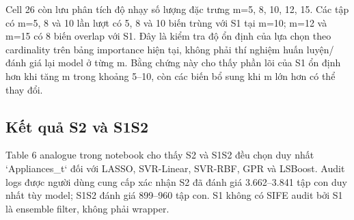 Cell 26 còn lưu phân tích độ nhạy số lượng đặc trưng m=5, 8, 10, 12, 15. Các tập có m=5, 8 và 10 lần lượt có 5, 8 và 10 biến trùng với S1 tại m=10; m=12 và m=15 có 8 biến overlap với S1. Đây là kiểm tra độ ổn định của lựa chọn theo cardinality trên bảng importance hiện tại, không phải thí nghiệm huấn luyện/đánh giá lại model ở từng m. Bằng chứng này cho thấy phần lõi của S1 ổn định hơn khi tăng m trong khoảng 5--10, còn các biến bổ sung khi m lớn hơn có thể thay đổi.

\subsection{Kết quả S2 và S1S2}\label{kux1ebft-quux1ea3-s2-vuxe0-s1s2}

Table 6 analogue trong notebook cho thấy S2 và S1S2 đều chọn duy nhất `Appliances\_t` đối với LASSO, SVR-Linear, SVR-RBF, GPR và LSBoost. Audit logs được người dùng cung cấp xác nhận S2 đã đánh giá 3.662--3.841 tập con duy nhất tùy model; S1S2 đánh giá 899--960 tập con. S1 không có SIFE audit bởi S1 là ensemble filter, không phải wrapper.

